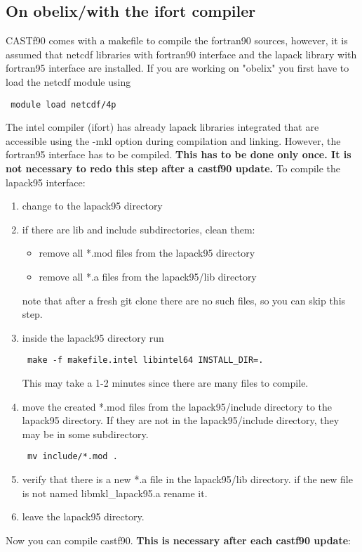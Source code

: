 \documentclass[11p,a4paper]{article}
\begin{document}
\subsection{On obelix/with the ifort compiler}
CASTf90 comes with a makefile to compile the fortran90 sources, however, it is assumed that netcdf libraries with fortran90 interface and the lapack library with fortran95 interface are installed.
If you are working on "obelix" you first have to load the netcdf module using
\begin{verbatim}
 module load netcdf/4p
\end{verbatim}
The intel compiler (ifort) has already lapack libraries integrated that are accessible using the -mkl option during compilation and linking. However, the fortran95 interface has to be compiled. \textbf{This has to be done only once. It is not necessary to redo this step after a castf90 update.} To compile the lapack95 interface:
\begin{enumerate}
\item change to the lapack95 directory
\item if there are lib and include subdirectories, clean them:
\begin{itemize}
\item remove all *.mod files from the lapack95 directory
\item remove all *.a files from the lapack95/lib directory
\end{itemize}
note that after a fresh git clone there are no such files, so you can skip this step.
\item inside the lapack95 directory run
\begin{verbatim}
 make -f makefile.intel libintel64 INSTALL_DIR=.
\end{verbatim}
This may take a 1-2 minutes since there are many files to compile.
\item move the created *.mod files from the lapack95/include directory to the lapack95 directory. If they are not in the lapack95/include directory, they may be in some subdirectory.
\begin{verbatim}
 mv include/*.mod .
\end{verbatim}
\item verify that there is a new *.a file in the lapack95/lib directory. if the new file is not named  libmkl\_lapack95.a rename it.
\item leave the lapack95 directory.
\end{enumerate}
Now you can compile castf90. \textbf{This is necessary after each castf90 update}:
\end{document}
